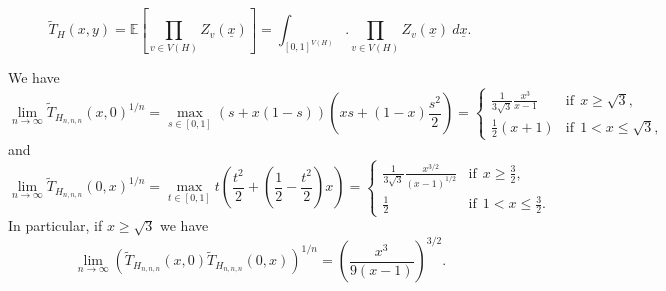\documentclass[10pt,a4paper]{amsart}
\newcommand{\wT}{\widetilde{T}}
\begin{document}
\begin{equation} \label{eq-vlsz}
\wT_H(x,y)=\mathbb{E}\left[\prod_{v\in V(H)}Z_v(\underline{x})\right]=\int_{[0,1]^{V(H)}}.\prod_{v\in V(H)}Z_v(\underline{x})\ d\underline{x}.
\end{equation}

\begin{Th} We have
$$\lim_{n\to \infty}\wT_{H_{n,n,n}}(x,0)^{1/n}=\max_{s\in [0,1]}\left(s+x(1-s)\right)\left(xs+(1-x)\frac{s^2}{2}\right)=\begin{cases}\frac{1}{3\sqrt{3}}\frac{x^3}{x-1} &\text{if}\ \ x\geqslant\sqrt{3}, \\ 
\frac{1}{2}(x+1) &\text{if}\ \ 1< x\leqslant   \sqrt{3},\end{cases}$$
and 
$$\lim_{n\to \infty}\wT_{H_{n,n,n}}(0,x)^{1/n}=\max_{t\in [0,1]} t\left(\frac{t^2}{2}+\left(\frac{1}{2}-\frac{t^2}{2}\right)x\right)=\begin{cases}\frac{1}{3\sqrt{3}}\frac{x^{3/2}}{(x-1)^{1/2}} &\text{if}\ \ x\geqslant\frac{3}{2},  \\ 
\frac{1}{2} &\text{if}\ \ 1< x\leqslant   \frac{3}{2}.
\end{cases}$$
In particular, if $x\geqslant\sqrt{3}$ we have
$$\lim_{n\to \infty}\left(\wT_{H_{n,n,n}}(x,0)\wT_{H_{n,n,n}}(0,x)\right)^{1/n}=\left(\frac{x^3}{9(x-1)}\right)^{3/2}.$$
\end{Th}
\end{document}
